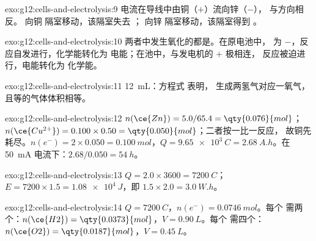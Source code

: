 \begin{solution}{exo:g12:cells-and-electrolysis:9}
电流在导线中由铜（$+$）流向锌（$-$），
与方向相反。 向铜
隔室移动，该隔室失去 ； 向锌
隔室移动，该隔室得到 。
\end{solution}

\begin{solution}{exo:g12:cells-and-electrolysis:10}
两者中发生氧化的都是。在原电池中，
为 $-$，反应自发进行，化学能转化为
电能；在池中，与发电机的 $+$ 极相连，
反应被迫进行，电能转化为
化学能。
\end{solution}

\begin{solution}{exo:g12:cells-and-electrolysis:11}
\qty{12}{mL}：方程式  表明，
生成两氢气对应一氧气，
且等的气体体积相等。
\end{solution}

\begin{solution}{exo:g12:cells-and-electrolysis:12}
$n(\ce{Zn}) = 5.0/65.4 = \qty{0.076}{mol}$；
$n(\ce{Cu^{2+}}) = 0.100 \times 0.50 = \qty{0.050}{mol}$；二者按一比一反应，
故铜先耗尽。$n(e^-) = 2 \times 0.050
= \qty{0.100}{mol}$，$Q = \qty{9.65e3}{C} = \qty{2.68}{A.h}$。在
\qty{50}{mA} 电流下：$2.68/0.050 = \qty{54}{h}$。
\end{solution}

\begin{solution}{exo:g12:cells-and-electrolysis:13}
$Q = 2.0 \times 3600 = \qty{7200}{C}$；$E = 7200 \times 1.5 =
\qty{1.08e4}{J}$，即 $1.5 \times 2.0 = \qty{3.0}{W.h}$。
\end{solution}

\begin{solution}{exo:g12:cells-and-electrolysis:14}
$Q = \qty{7200}{C}$，$n(e^-) = \qty{0.0746}{mol}$。每个
 需两个：$n(\ce{H2}) = \qty{0.0373}{mol}$，$V = \qty{0.90}{L}$。每个
 需四个：$n(\ce{O2}) = \qty{0.0187}{mol}$，$V = \qty{0.45}{L}$。
\end{solution}

